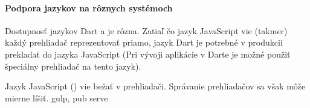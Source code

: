 \paragraph{Podpora jazykov na rôznych systémoch}
Dostupnosť jazykov Dart a \JS{} je rôzna. Zatiaľ čo jazyk JavaScript vie (takmer) každý prehliadač reprezentovať priamo, jazyk Dart je potrebné v produkcii prekladať do jazyka JavaScript (Pri vývoji aplikácie v Darte je možné použiť špeciálny prehliadač na tento jazyk).

Jazyk JavaScript (\JS{}) vie bežať v prehliadači. Správanie prehliadačov sa však môže mierne líšiť.
\TODO gulp, pub serve



\begin{comment}
\section{Rozdiely a ich prepojenie}
Rozdielne časti daných jazykov a návrh riešenia, ako by sa dali nahradiť. Využitie zaujímavých čŕt jazyka \JS{}.

npm vs. pub
\end{comment}